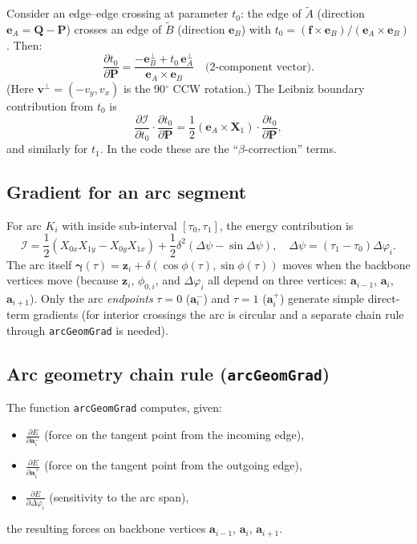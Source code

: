 \documentclass[12pt]{article}
\newcommand{\pderiv}[2]{\frac{\partial #1}{\partial #2}}
\begin{document}
Consider an edge–edge crossing at parameter $t_0$: the edge of $\tilde A$ (direction
$\mathbf{e}_A = \mathbf{Q}-\mathbf{P}$) crosses an edge of $\tilde B$ (direction $\mathbf{e}_B$)
with $t_0 = (\mathbf{f}\times\mathbf{e}_B)/(\mathbf{e}_A\times\mathbf{e}_B)$.  Then:
\[
  \pderiv{t_0}{\mathbf{P}} = \frac{-\mathbf{e}_B^\perp + t_0\,\mathbf{e}_A^\perp}
                            {\mathbf{e}_A\times\mathbf{e}_B}
  \quad\text{(2-component vector).}
\]
(Here $\mathbf{v}^\perp = (-v_y, v_x)$ is the 90$^\circ$ CCW rotation.)
The Leibniz boundary contribution from $t_0$ is
\[
  \pderiv{\mathcal{I}}{t_0}\cdot\pderiv{t_0}{\mathbf{P}}
  = \frac{1}{2}(\mathbf{e}_A\times\mathbf{X}_1)\cdot\pderiv{t_0}{\mathbf{P}},
\]
and similarly for $t_1$.  In the code these are the ``$\beta$-correction'' terms.

\subsection{Gradient for an arc segment}

For arc $K_i$ with inside sub-interval $[\tau_0, \tau_1]$, the energy contribution is
\[
  \mathcal{I} = \frac{1}{2}(X_{0x}X_{1y} - X_{0y}X_{1x})
              + \frac{1}{2}\delta^2(\Delta\psi - \sin\Delta\psi),
  \quad \Delta\psi = (\tau_1-\tau_0)\Delta\varphi_i.
\]
The arc itself $\boldsymbol{\gamma}(\tau) = \mathbf{z}_i + \delta(\cos\phi(\tau),\sin\phi(\tau))$
moves when the backbone vertices move (because $\mathbf{z}_i$, $\phi_{0,i}$, and $\Delta\varphi_i$
all depend on three vertices: $\mathbf{a}_{i-1}$, $\mathbf{a}_i$, $\mathbf{a}_{i+1}$).
Only the arc \emph{endpoints} $\tau = 0$ ($\mathbf{a}_i^-$) and $\tau = 1$ ($\mathbf{a}_i^+$)
generate simple direct-term gradients (for interior crossings the arc is circular and
a separate chain rule through \texttt{arcGeomGrad} is needed).

\subsection{Arc geometry chain rule (\texttt{arcGeomGrad})}
\label{sec:arcgeomgrad}

The function \texttt{arcGeomGrad} computes, given:
\begin{itemize}
  \item $\pderiv{E}{\mathbf{a}_i^-}$ (force on the tangent point from the incoming edge),
  \item $\pderiv{E}{\mathbf{a}_i^+}$ (force on the tangent point from the outgoing edge),
  \item $\pderiv{E}{\Delta\varphi_i}$ (sensitivity to the arc span),
\end{itemize}
the resulting forces on backbone vertices $\mathbf{a}_{i-1}$, $\mathbf{a}_i$, $\mathbf{a}_{i+1}$.
\end{document}
